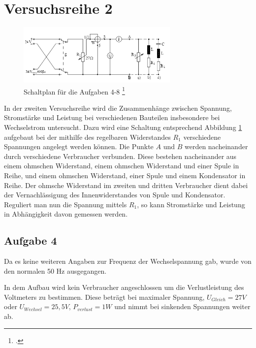 \section{Versuchsreihe 2}
\begin{figure}[H] 
  \centering
	\includegraphics[width=0.7\textwidth]{Schaltplan.png}
	\caption{Schaltplan für die Aufgaben 4-8 \footcite{anleitung-ws2014}}
  \label{fig:kreisel1}
\end{figure}
In der zweiten Versuchsreihe wird die Zusammenhänge zwischen Spannung, Stromstärke und Leistung bei verschiedenen Bauteilen insbesondere bei Wechselstrom untersucht. Dazu wird eine Schaltung entsprechend Abbildung \ref{fig:kreisel1} aufgebaut bei der mithilfe des regelbaren Widerstandes $ R_1 $ verschiedene Spannungen angelegt werden können. Die Punkte $ A $ und $ B $ werden nacheinander durch verschiedene Verbraucher verbunden. Diese bestehen nacheinander aus einem ohmschen Widerstand, einem ohmschen Widerstand und einer Spule in Reihe, und einem ohmschen Widerstand, einer Spule und einem Kondensator in Reihe. Der ohmsche Widerstand im zweiten und dritten Verbraucher dient dabei der Vernachlässigung des Innenwiderstandes von Spule und Kondensator. Reguliert man nun die Spannung mittels $ R_1 $, so kann Stromstärke und Leistung in Abhängigkeit davon gemessen werden.
\subsection{Aufgabe 4}
Da es keine weiteren Angaben zur Frequenz der Wechselspannung gab, wurde von den normalen 50 Hz ausgegangen.

In dem Aufbau wird kein Verbraucher angeschlossen um die Verlustleistung des Voltmeters zu bestimmen. Diese beträgt bei maximaler Spannung, $U_{Gleich}=27V$ oder $U_{Wechsel}=25,5V$, $P_{verlust}=1W$ und nimmt bei sinkenden Spannungen weiter ab.
